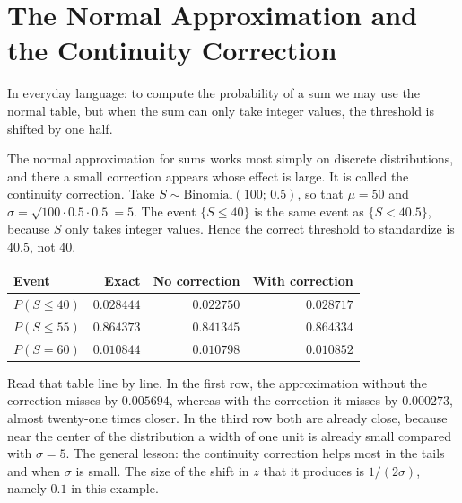 \section{The Normal Approximation and the Continuity Correction}

In everyday language: to compute the probability of a sum we may use the normal
table, but when the sum can only take integer values, the threshold is shifted by
one half.

The normal approximation for sums works most simply on discrete distributions, and
there a small correction appears whose effect is large. It is called the continuity
correction. Take $S\sim
\text{Binomial}(100;\,0.5)$, so that $\mu=50$ and $\sigma=\sqrt{100\cdot0.5
\cdot0.5}=5$. The event $\{S\le40\}$ is the same event as $\{S<40.5\}$, because
$S$ only takes integer values. Hence the correct threshold to standardize is
$40.5$, not $40$.

\begin{center}
\begin{tabular}{lrrr}
\hline
Event & Exact & No correction & With correction \\
\hline
$P(S\le40)$ & $0.028444$ & $0.022750$ & $0.028717$ \\
$P(S\le55)$ & $0.864373$ & $0.841345$ & $0.864334$ \\
$P(S=60)$   & $0.010844$ & $0.010798$ & $0.010852$ \\
\hline
\end{tabular}
\end{center}

Read that table line by line. In the first row, the approximation without the
correction misses by $0.005694$, whereas with the correction it misses by
$0.000273$, almost twenty-one times closer. In the third row both are already
close, because near the center of the distribution a width of one unit is already
small compared with $\sigma=5$. The general lesson: the continuity correction helps
most in the tails and when $\sigma$ is small. The size of the shift in $z$ that it
produces is $1/(2\sigma)$, namely $0.1$ in this example.


